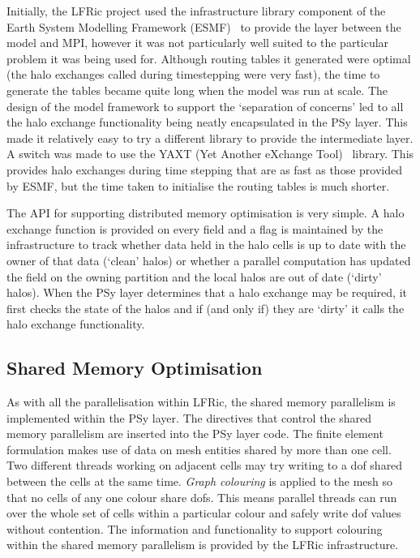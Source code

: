 \documentclass[review,times]{elsarticle}
\begin{document}
Initially, the LFRic project used the infrastructure library component
of the Earth System Modelling Framework (ESMF)~\cite{ESMFDocs} to
provide the layer between the model and MPI, however it was not particularly
well suited to the particular problem it was being used for. Although
routing tables it generated were optimal (the halo exchanges called
during timestepping were very fast), the time to generate the tables
became quite long when the model was run at scale. The design of the
model framework to support the `separation of concerns' led to all the
halo exchange functionality being neatly encapsulated in the PSy layer.
This made it relatively easy to try a different library to provide the
intermediate layer. A switch was made to use the YAXT (Yet Another
eXchange Tool)~\cite{YAXTDocs} library. This provides
halo exchanges during time stepping that are as fast as those provided
by ESMF, but the time taken to initialise the routing tables is much
shorter.

The API for supporting distributed memory optimisation is very simple. A
halo exchange function is provided on every field and a flag is
maintained by the infrastructure to track whether data held in the halo
cells is up to date with the owner of that data (`clean' halos) or
whether a parallel computation has updated the field on the owning
partition and the local halos are out of date (`dirty' halos). When the
PSy layer determines that a halo exchange may be required, it first
checks the state of the halos and if (and only if) they are `dirty' it 
calls the halo exchange functionality.

\subsection{\label{sec:sub:sharedmem}Shared Memory Optimisation}

As with all the parallelisation within LFRic, the shared memory
parallelism is implemented within the PSy layer. The directives that
control the shared memory parallelism are inserted into the PSy layer
code. The finite element formulation makes use of data on mesh entities
shared by more than one cell. Two different threads working on
adjacent cells may try writing to a dof shared between the cells at the
same time.
{\em Graph colouring} is applied to the mesh so that no cells of any one
colour share dofs. This means parallel threads can run over the whole
set of cells within a particular colour and safely write dof values
without contention.
The information and functionality to support
colouring within the shared memory parallelism is provided by the LFRic
infrastructure.
\end{document}
